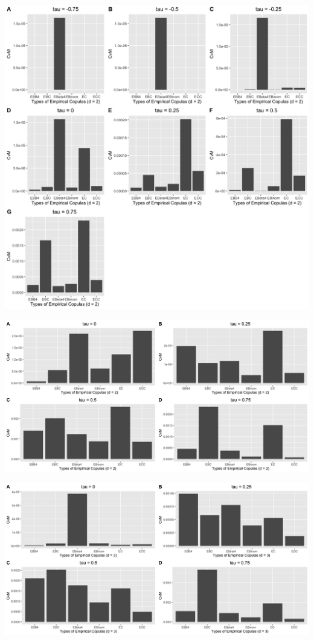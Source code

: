 \documentclass[12pt]{report}
\newcommand{\1}{\mathbf{1}}
\begin{document}
\begin{flushleft}
\begin{center}
\label{N_2d_s_CvM}
\includegraphics[width=17cm]{ExceedanceCvM/N_2d_s_CvM.png}
\end{center}%

\begin{center}
\label{G_2d_s_CvM}
\includegraphics[width=17cm]{ExceedanceCvM/G_2d_s_CvM.png}
\end{center}%

\begin{center}
\label{G_3d_s_CvM}
\includegraphics[width=17cm]{ExceedanceCvM/G_3d_s_CvM.png}
\end{center}%


\end{flushleft}
\end{document}
